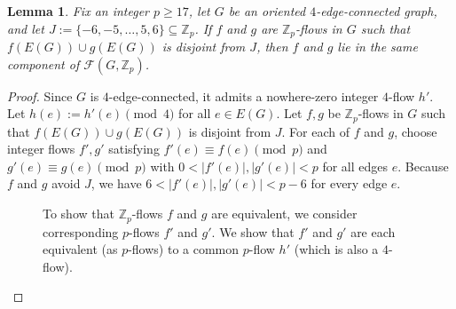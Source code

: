 \documentclass[a4paper,12pt]{article}
\theoremstyle{plain}
\newtheorem{lem}[theorem]{Lemma}
\theoremstyle{definition}
\renewcommand\ge\geqslant
\begin{document}
\begin{lem}
\label{away-connected-lem}
Fix an integer $p\ge 17$, let $G$ be an oriented $4$-edge-connected graph, and let
$J:=\{-6,-5,\ldots,5,6\}\subseteq \mathbb{Z}_p$.
If $f$ and $g$ are $\mathbb{Z}_p$-flows in $G$ such that $f(E(G))\cup g(E(G))$ is disjoint from $J$, then $f$ and $g$ lie in the same component of $\mathcal{F}(G,\mathbb{Z}_p)$.
\end{lem}

\begin{proof}
Since $G$ is $4$-edge-connected, it admits a nowhere-zero integer $4$-flow $h'$. 
Let $h(e):=h'(e)\pmod 4$ for all $e\in E(G)$.
%
Let $f,g$ be $\mathbb{Z}_p$-flows in $G$ such that $f(E(G))\cup g(E(G))$ is disjoint from $J$. For each of $f$ and $g$, choose integer flows $f',g'$ satisfying $f'(e)\equiv f(e)\pmod p$ and $g'(e)\equiv g(e)\pmod p$ with $0<|f'(e)|,|g'(e)|<p$ for all edges $e$. Because $f$ and $g$ avoid $J$, we have $6<|f'(e)|,|g'(e)|<p-6$ for every edge $e$.

\begin{figure}[!h]
\centering
{}
	\captionsetup{width=.720\textwidth}
	\caption{To show that $\mathbb{Z}_p$-flows $f$ and $g$ are equivalent, we consider corresponding $p$-flows $f'$ and $g'$.  We show that $f'$ and $g'$ are each equivalent (as $p$-flows) to a common $p$-flow $h'$ (which is also a $4$-flow).%
}
\end{figure}



\end{proof}
\end{document}
